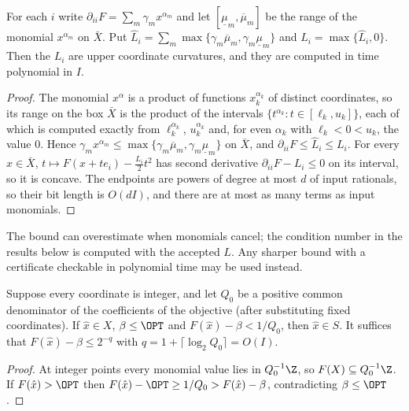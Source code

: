 \begin{lemma}\label{lem:intcurv}
For each $i$ write $\partial_{ii}F=\sum_m\gamma_mx^{\alpha_m}$ and let
$[\underline\mu_m,\overline\mu_m]$ be the range of the monomial $x^{\alpha_m}$
on $\bar X$. Put $\hat L_i=\sum_m\max\{\gamma_m\overline\mu_m,
\gamma_m\underline\mu_m\}$ and $L_i=\max\{\hat L_i,0\}$. Then the $L_i$ are
upper coordinate curvatures, and they are computed in time polynomial in $I$.
\end{lemma}

\begin{proof}
The monomial $x^{\alpha}$ is a product of functions $x_k^{\alpha_k}$ of
distinct coordinates, so its range on the box $\bar X$ is the product of the
intervals $\{t^{\alpha_k}:t\in[\ell_k,u_k]\}$, each of which is computed
exactly from $\ell_k^{\alpha_k}$, $u_k^{\alpha_k}$ and, for even $\alpha_k$
with $\ell_k<0<u_k$, the value $0$. Hence
$\gamma_mx^{\alpha_m}\le\max\{\gamma_m\overline\mu_m,\gamma_m\underline\mu_m\}$
on $\bar X$, and $\partial_{ii}F\le\hat L_i\le L_i$. For every $x\in\bar X$,
$t\mapsto F(x+te_i)-\frac{L_i}2t^2$ has second derivative
$\partial_{ii}F-L_i\le0$ on its interval, so it is concave. The endpoints are
powers of degree at most $d$ of input rationals, so their bit length is
$O(dI)$, and there are at most as many terms as input monomials.
\end{proof}

The bound can overestimate when monomials cancel; the condition number in
the results below is computed with the accepted $L$. Any sharper bound with a
certificate checkable in polynomial time may be used instead.

\begin{proposition}\label{prop:lattice}
Suppose every coordinate is integer, and let $Q_0$ be a positive common
denominator of the coefficients of the objective (after substituting fixed
coordinates). If $\hat x\in X$, $\beta\le\OPT$ and
$F(\hat x)-\beta<1/Q_0$, then $\hat x\in S$. It suffices that
$F(\hat x)-\beta\le2^{-q}$ with $q=1+\lceil\log_2Q_0\rceil=O(I)$.
\end{proposition}

\begin{proof}
At integer points every monomial value lies in $Q_0^{-1}\Z$, so
$F(X)\subseteq Q_0^{-1}\Z$. If $F(\hat x)>\OPT$ then
$F(\hat x)-\OPT\ge1/Q_0>F(\hat x)-\beta$, contradicting $\beta\le\OPT$.
\end{proof}

